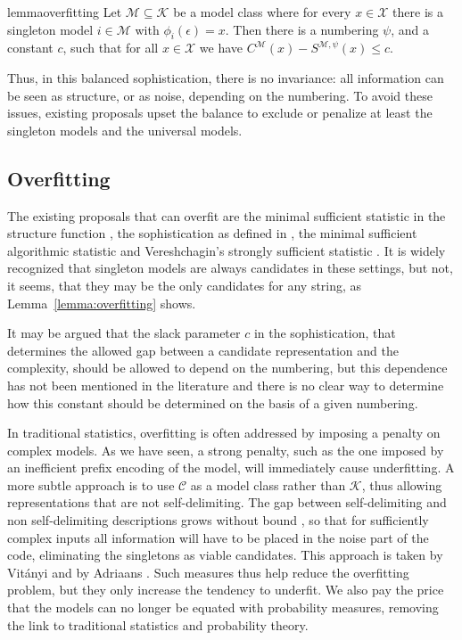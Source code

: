 \documentclass{style/llncs}
\newcommand{\M}{\mathscr M}
\newcommand{\C}{\mathscr C}
\newcommand{\K}{\mathscr K}
\newcommand{\X}{\mathscr X}
\begin{document}
\begin{restatable}[Overfitting]{lemma}{overfitting}
Let $\M \subseteq \K$ be a model class where for every $x\in\X$ there is a singleton model $i\in\M$ with $\phi_i(\epsilon)=x$. Then there is a numbering $\psi$, and a constant $c$, such that for all $x\in\X$ we have $C^\M(x)-S^{\M,\psi}(x)\leq c$.\label{lemma:overfitting}
\end{restatable}
\noindent Thus, in this balanced sophistication, there is no invariance: all information can be seen as structure, or as noise, depending on the numbering. To avoid these issues, existing proposals upset the balance to exclude or penalize at least the singleton models and the universal models.
 
\subsection{Overfitting}

The existing proposals that can overfit are the minimal sufficient statistic in the structure function \cite{cover1985kolmogorov}, the sophistication as defined in \cite{mota2013sophistication}, the minimal sufficient algorithmic statistic \cite{gacs2001algorithmic} and Vereshchagin's strongly sufficient statistic \cite{vereshchagin2013algorithmic}. It is widely recognized that singleton models are always candidates in these settings, but not, it seems, that they may be the only candidates for any string, as Lemma~\ref{lemma:overfitting} shows. 

It may be argued that the slack parameter $c$ in the sophistication, that determines the allowed gap between a candidate representation and the complexity, should be allowed to depend on the numbering, but this dependence has not been mentioned in the literature and there is no clear way to determine how this constant should be determined on the basis of a given numbering. 

In traditional statistics, overfitting is often addressed by imposing a penalty on complex models. As we have seen, a strong penalty, such as the one imposed by an inefficient prefix encoding of the model, will immediately cause underfitting. A more subtle approach is to use $\C$ as a model class rather than $\K$, thus allowing representations that are not self-delimiting. The gap between self-delimiting and non self-delimiting descriptions grows without bound 
\cite[Section~4.5.5]{vitanyi2004meaningful}, so that for sufficiently complex inputs all information will have to be placed in the noise part of the code, eliminating the singletons as viable candidates. This approach is taken by Vit\'anyi \cite{vitanyi2004meaningful} and by Adriaans \cite{adriaans2012facticity}. Such measures thus help reduce the overfitting problem, but they only increase the tendency to underfit. We also pay the price that the models can no longer be equated with probability measures, removing the link to traditional statistics and probability theory.
\end{document}

